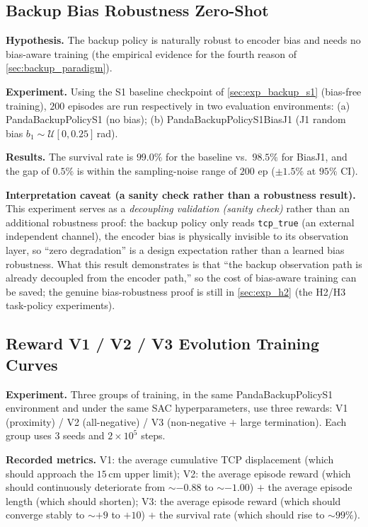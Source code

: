 \subsection{Backup Bias Robustness Zero-Shot}\label{sec:exp_backup_bias}

\textbf{Hypothesis.} The backup policy is naturally robust to encoder bias and needs no bias-aware training (the empirical evidence for the fourth reason of \cref{sec:backup_paradigm}).

\textbf{Experiment.} Using the S1 baseline checkpoint of \cref{sec:exp_backup_s1} (bias-free training), $200$ episodes are run respectively in two evaluation environments: (a) PandaBackupPolicyS1 (no bias); (b) PandaBackupPolicyS1BiasJ1 (J1 random bias $b_1 \sim \mathcal{U}[0, 0.25]$\,rad).

\textbf{Results.} The survival rate is $99.0\%$ for the baseline vs.\ $98.5\%$ for BiasJ1, and the gap of $0.5\%$ is within the sampling-noise range of $200$ ep ($\pm 1.5\%$ at $95\%$ CI).

\textbf{Interpretation caveat (a sanity check rather than a robustness result).} This experiment serves as a \emph{decoupling validation (sanity check)} rather than an additional robustness proof: the backup policy only reads \texttt{tcp\_true} (an external independent channel), the encoder bias is physically invisible to its observation layer, so ``zero degradation'' is a design expectation rather than a learned bias robustness. What this result demonstrates is that ``the backup observation path is already decoupled from the encoder path,'' so the cost of bias-aware training can be saved; the genuine bias-robustness proof is still in \cref{sec:exp_h2} (the H2/H3 task-policy experiments).

\subsection{Reward V1 / V2 / V3 Evolution Training Curves}\label{sec:exp_reward_evolution}

\textbf{Experiment.} Three groups of training, in the same PandaBackupPolicyS1 environment and under the same SAC hyperparameters, use three rewards: V1 (proximity) / V2 (all-negative) / V3 (non-negative $+$ large termination). Each group uses $3$ seeds and $2 \times 10^5$ steps.

\textbf{Recorded metrics.} V1: the average cumulative TCP displacement (which should approach the $15$\,cm upper limit); V2: the average episode reward (which should continuously deteriorate from $\sim -0.88$ to $\sim -1.00$) $+$ the average episode length (which should shorten); V3: the average episode reward (which should converge stably to $\sim +9$ to $+10$) $+$ the survival rate (which should rise to $\sim 99\%$).


